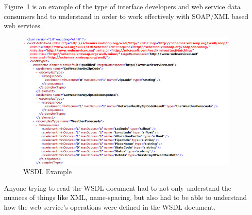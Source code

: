 Figure~\ref{f:wsdl-example}\cite{mycodde2016} is an example of the type of
interface developers and web service data consumers had to understand in order
to work effectively with SOAP/XML based web services.  
\begin{figure}[!ht]
  \centering\includegraphics[width=\columnwidth]{images/wsdl-example.jpg}
  \caption{WSDL Example}\label{f:wsdl-example}
\end{figure}
Anyone trying to read the WSDL document had to not only understand the nuances 
of things like XML, name-spacing, but also had to be able to understand how the 
web service's operations were defined in the WSDL document.

